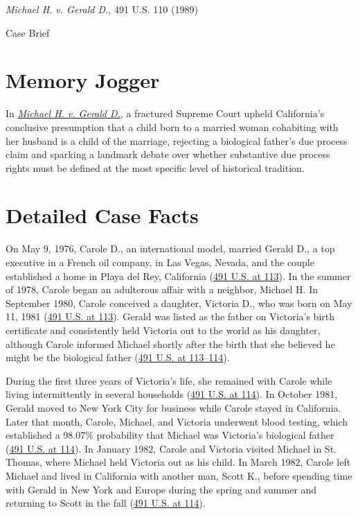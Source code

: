 \documentclass[12pt]{article}
\begin{document}
\begin{center}
{\LARGE \textit{Michael H. v. Gerald D.}, 491 U.S. 110 (1989)\par}
\vspace{0.8em}
{\large Case Brief\par}
\end{center}
\vspace{1em}

\section{Memory Jogger}

In \href{https://www.courtlistener.com/opinion/112295/michael-h-v-gerald-d/}{\textit{Michael H. v. Gerald D.}}, a fractured Supreme Court upheld California's conclusive presumption that a child born to a married woman cohabiting with her husband is a child of the marriage, rejecting a biological father's due process claim and sparking a landmark debate over whether substantive due process rights must be defined at the most specific level of historical tradition.

\section{Detailed Case Facts}

On May 9, 1976, Carole D., an international model, married Gerald D., a top executive in a French oil company, in Las Vegas, Nevada, and the couple established a home in Playa del Rey, California (\href{https://supreme.justia.com/cases/federal/us/491/110/}{491 U.S. at 113}). In the summer of 1978, Carole began an adulterous affair with a neighbor, Michael H. In September 1980, Carole conceived a daughter, Victoria D., who was born on May 11, 1981 (\href{https://supreme.justia.com/cases/federal/us/491/110/}{491 U.S. at 113}). Gerald was listed as the father on Victoria's birth certificate and consistently held Victoria out to the world as his daughter, although Carole informed Michael shortly after the birth that she believed he might be the biological father (\href{https://supreme.justia.com/cases/federal/us/491/110/}{491 U.S. at 113--114}).

During the first three years of Victoria's life, she remained with Carole while living intermittently in several households (\href{https://supreme.justia.com/cases/federal/us/491/110/}{491 U.S. at 114}). In October 1981, Gerald moved to New York City for business while Carole stayed in California. Later that month, Carole, Michael, and Victoria underwent blood testing, which established a 98.07\% probability that Michael was Victoria's biological father (\href{https://supreme.justia.com/cases/federal/us/491/110/}{491 U.S. at 114}). In January 1982, Carole and Victoria visited Michael in St. Thomas, where Michael held Victoria out as his child. In March 1982, Carole left Michael and lived in California with another man, Scott K., before spending time with Gerald in New York and Europe during the spring and summer and returning to Scott in the fall (\href{https://supreme.justia.com/cases/federal/us/491/110/}{491 U.S. at 114}).
\end{document}
